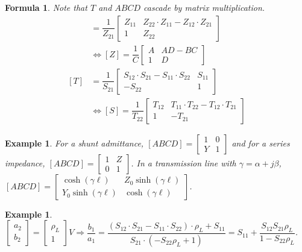 \documentclass[11pt,landscape]{article}
\newtheorem{formula}[definition]{Formula}
\newtheorem{example}[definition]{Example}
\begin{document}
\begin{multicols}{3}
\begin{formula}
    Note that $T$ and $ABCD$ cascade by matrix multiplication.
    \begin{align*}
        [ABCD]&=\dfrac{1}{Z_{21}}\begin{bmatrix}
            Z_{11} & Z_{22}\cdot Z_{11} - Z_{12}\cdot Z_{21}\\
            1 & Z_{22}
        \end{bmatrix} \\ &\Leftrightarrow
        [Z]=\dfrac{1}{C}\begin{bmatrix}
            A & AD-BC\\
            1 & D
        \end{bmatrix}\\
        [T]&=\dfrac{1}{S_{21}}\begin{bmatrix}
            S_{12}\cdot S_{21} - S_{11}\cdot S_{22} & S_{11}\\
            -S_{22} & 1
        \end{bmatrix} \\ &\Leftrightarrow
        [S]=\dfrac{1}{T_{22}}\begin{bmatrix}
            T_{12} & T_{11}\cdot T_{22} - T_{12}\cdot T_{21}\\
            1 & -T_{21}
        \end{bmatrix}
    \end{align*}
\end{formula}

\begin{example}
    For a shunt admittance, $[ABCD]=\begin{bmatrix}1 & 0 \\ Y & 1\end{bmatrix}$ and for a series impedance, $[ABCD]=\begin{bmatrix}1 & Z \\ 0 & 1\end{bmatrix}$. In a transmission line with $\gamma=\alpha+j\beta$, $[ABCD]=\begin{bmatrix}\cosh(\gamma\ell) & Z_0\sinh(\gamma\ell) \\ Y_0\sinh(\gamma\ell) & \cosh(\gamma\ell)\end{bmatrix}$.
\end{example}

\begin{example}
    $\begin{bmatrix}a_2 \\ b_2\end{bmatrix}=\begin{bmatrix}\rho_L \\ 1\end{bmatrix}V\Rightarrow \dfrac{b_1}{a_1}=\dfrac{(S_{12}\cdot S_{21} - S_{11}\cdot S_{22})\cdot \rho_L + S_{11}}{S_{21}\cdot(-S_{22}\rho_L+1)}=S_{11}+\dfrac{S_{12}S_{21}\rho_L}{1-S_{22}\rho_L}$.
\end{example}


\end{multicols}
\end{document}
